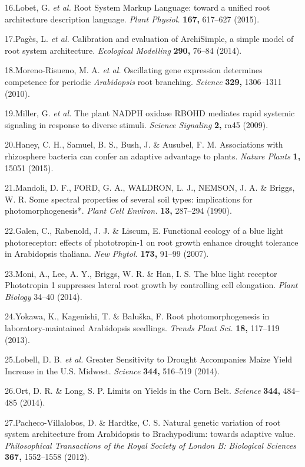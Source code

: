 \documentclass[]{article}
\begin{document}
16.Lobet, G. \emph{et al.} Root System Markup Language: toward a unified
root architecture description language. \emph{Plant Physiol.}
\textbf{167,} 617--627 (2015).

17.Pag{è}s, L. \emph{et al.} Calibration and evaluation of ArchiSimple,
a simple model of root system architecture. \emph{Ecological Modelling}
\textbf{290,} 76--84 (2014).

18.Moreno-Risueno, M. A. \emph{et al.} Oscillating gene expression
determines competence for periodic \emph{Arabidopsis} root branching.
\emph{Science} \textbf{329,} 1306--1311 (2010).

19.Miller, G. \emph{et al.} The plant NADPH oxidase RBOHD mediates rapid
systemic signaling in response to diverse stimuli. \emph{Science
Signaling} \textbf{2,} ra45 (2009).

20.Haney, C. H., Samuel, B. S., Bush, J. \& Ausubel, F. M. Associations
with rhizosphere bacteria can confer an adaptive advantage to plants.
\emph{Nature Plants} \textbf{1,} 15051 (2015).

21.Mandoli, D. F., FORD, G. A., WALDRON, L. J., NEMSON, J. A. \& Briggs,
W. R. Some spectral properties of several soil types: implications for
photomorphogenesis*. \emph{Plant Cell Environ.} \textbf{13,} 287--294
(1990).

22.Galen, C., Rabenold, J. J. \& Liscum, E. Functional ecology of a blue
light photoreceptor: effects of phototropin-1 on root growth enhance
drought tolerance in Arabidopsis thaliana. \emph{New Phytol.}
\textbf{173,} 91--99 (2007).

23.Moni, A., Lee, A. Y., Briggs, W. R. \& Han, I. S. The blue light
receptor Phototropin 1 suppresses lateral root growth by controlling
cell elongation. \emph{Plant Biology} 34--40 (2014).

24.Yokawa, K., Kagenishi, T. \& Balu{š}ka, F. Root photomorphogenesis in
laboratory-maintained Arabidopsis seedlings. \emph{Trends Plant Sci.}
\textbf{18,} 117--119 (2013).

25.Lobell, D. B. \emph{et al.} Greater Sensitivity to Drought
Accompanies Maize Yield Increase in the U.S. Midwest. \emph{Science}
\textbf{344,} 516--519 (2014).

26.Ort, D. R. \& Long, S. P. Limits on Yields in the Corn Belt.
\emph{Science} \textbf{344,} 484--485 (2014).

27.Pacheco-Villalobos, D. \& Hardtke, C. S. Natural genetic variation of
root system architecture from Arabidopsis to Brachypodium: towards
adaptive value. \emph{Philosophical Transactions of the Royal Society of
London B: Biological Sciences} \textbf{367,} 1552--1558 (2012).
\end{document}
